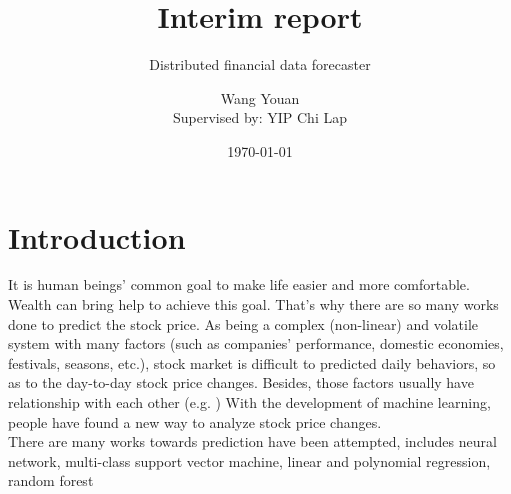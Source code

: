 \documentclass{scrartcl}
\title{Interim report}
\subtitle{Distributed financial data forecaster}
\author{Wang Youan\\{\small Supervised by: YIP Chi Lap}}
\date{\today}
\begin{document}
	\maketitle
	\section{Introduction}
	It is human beings' common goal to make life easier and more comfortable. Wealth can bring help to achieve this goal. That's why there are so many works done to predict the stock price. As being a complex (non-linear) and volatile system with many factors (such as companies' performance, domestic economies, festivals, seasons, etc.)\cite{chen1986economic}, stock market is difficult to predicted daily behaviors, so as to the day-to-day stock price changes. Besides, those factors usually have relationship with each other (e.g. ) With the development of machine learning, people have found a new way to analyze stock price changes. \\
	There are many works towards prediction have been attempted, includes neural network\cite{kimoto1990stock,naeini2010stock}, multi-class support vector machine\cite{kercheval2015modelling}, linear and polynomial regression\cite{nunnostock,alexanderstock}, random forest\cite{alexanderstock,lauretto2013evaluation}
	
\end{document}
